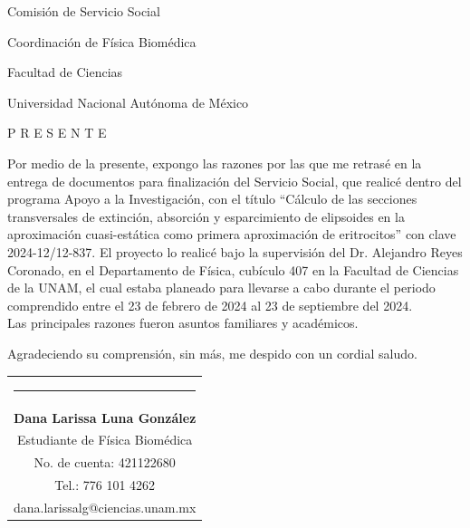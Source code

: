 \documentclass[9pt,letterpaper]{article}
\begin{document}
	Comisión de Servicio Social
	
	Coordinación de Física Biomédica
	
	Facultad de Ciencias
	
	Universidad Nacional Autónoma de México
	
	P R E S E N T E
	
	\vspace{0.5cm}
	
	
	Por medio de la presente, expongo las razones por las que me retrasé en la entrega de documentos para finalización del
	Servicio Social, que realicé dentro del programa Apoyo a la Investigación, con el título ``Cálculo de las secciones transversales de extinción, absorción y esparcimiento de elipsoides en la aproximación cuasi-estática como primera aproximación de eritrocitos'' con clave 2024-12/12-837. El proyecto lo realicé bajo la supervisión del Dr. Alejandro Reyes Coronado, en el Departamento de Física, cubículo 407 en la Facultad de Ciencias de la UNAM, el cual estaba planeado para llevarse a cabo durante el periodo comprendido entre el 23 de febrero de 2024 al 23 de septiembre del 2024. \\
	
	
	\noindent Las principales razones fueron asuntos familiares y académicos. 
	
	\vspace{1cm}
	\noindent Agradeciendo su comprensión, sin más, me despido con un cordial saludo.
	
	{\vspace{2.55cm}\begin{tabular} { c}
			\setlength{\tabcolsep}{15pt}
			\renewcommand{\arraystretch}{1}
			\noindent\rule{5.5cm}{0.4pt}\qquad \\
			
			\qquad  \textbf{Dana Larissa Luna González} \qquad \\
			\qquad Estudiante de Física Biomédica  \qquad \\ \qquad 
			No. de cuenta: 421122680\qquad \\  
			\qquad  Tel.: 776 101 4262 \qquad \\
			\qquad dana.larissalg@ciencias.unam.mx \qquad \\
			
		\end{tabular}
	}
	
\end{document}
